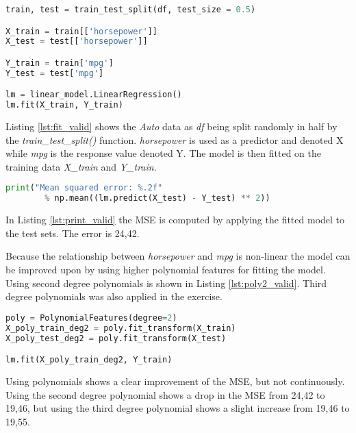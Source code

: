 \begin{lstlisting}[language=Python, label=lst:fit_valid, caption=Fitting linear regression]
train, test = train_test_split(df, test_size = 0.5)

X_train = train[['horsepower']]
X_test = test[['horsepower']]

Y_train = train['mpg']
Y_test = test['mpg']

lm = linear_model.LinearRegression()
lm.fit(X_train, Y_train)
\end{lstlisting}

Listing \ref{lst:fit_valid} shows the \emph{Auto} data as \emph{df} being split randomly in half by the \emph{train\_test\_split()} function. 
\emph{horsepower} is used as a predictor and denoted X while \emph{mpg} is the response value denoted Y. The model is then fitted on the training data \emph{X\_train} and \emph{Y\_train}.

\begin{lstlisting}[language=Python, label=lst:print_valid, caption=Printing MSE]
print("Mean squared error: %.2f" 
		% np.mean((lm.predict(X_test) - Y_test) ** 2))
\end{lstlisting}

In Listing \ref{lst:print_valid} the MSE is computed by applying the fitted model to the test sets. The error is 24,42. 

Because the relationship between \emph{horsepower} and \emph{mpg} is non-linear the model can be improved upon by using higher polynomial features for fitting the model. Using second degree polynomials is shown in Listing \ref{lst:poly2_valid}. Third degree polynomials was also applied in the exercise.

\begin{lstlisting}[language=Python, label=lst:poly2_valid, caption=Polynomial features with degree = 2]
poly = PolynomialFeatures(degree=2)
X_poly_train_deg2 = poly.fit_transform(X_train)
X_poly_test_deg2 = poly.fit_transform(X_test)

lm.fit(X_poly_train_deg2, Y_train)
\end{lstlisting}

Using polynomials shows a clear improvement of the MSE, but not continuously. Using the second degree polynomial shows a drop in the MSE from 24,42 to 19,46, but using the third degree polynomial shows a slight increase from 19,46 to 19,55. 

